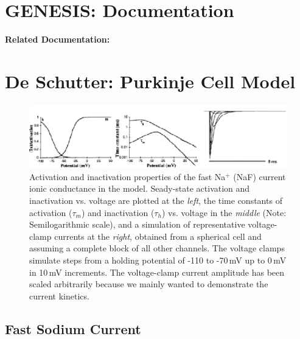 \documentclass[12pt]{article}
\begin{document}
\section*{GENESIS: Documentation}

{\bf Related Documentation:}

\section*{De Schutter: Purkinje Cell Model}

\begin{figure}[h]
\centering
   \includegraphics[scale=0.75]{figures/DS1.2Af.eps}
   \caption{Activation and inactivation properties of the fast Na$^+$ (NaF) current ionic conductance in the model. Seady-state activation and inactivation vs. voltage are plotted at the {\em left}, the time constants of activation ($\tau_m$) and inactivation ($\tau_h$) vs. voltage in the {\em middle} (Note: Semilogarithmic scale), and a simulation of representative voltage-clamp currents at the {\em right}, obtained from a spherical cell and assuming a complete block of all other channels. The voltage clamps simulate steps from a holding potential of -110 to -70\,mV up to 0\,mV in 10\,mV increments. The voltage-clamp current amplitude has been scaled arbitrarily because we mainly wanted to demonstrate the current kinetics.}
   \label{fig:DS1.2A}
\end{figure}

\subsection*{Fast Sodium Current}
\end{document}

